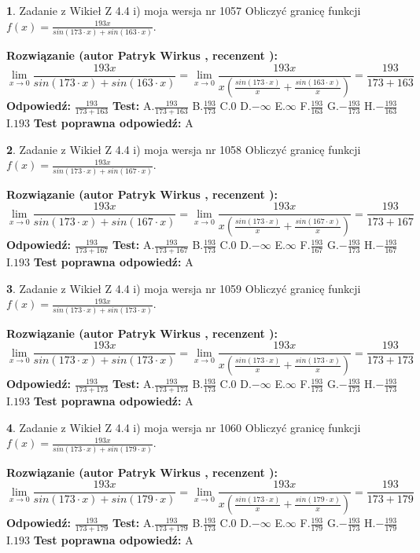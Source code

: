 \documentclass[12pt, a4paper]{article}
\theoremstyle{definition} %
\newtheorem{zad}{}
\newcommand{\zadStart}[1]{\begin{zad}#1\newline}
\newcommand{\zadStop}{\end{zad}}
\newcommand{\rozwStart}[2]{\noindent \textbf{Rozwiązanie (autor #1 , recenzent #2): }\newline}
\newcommand{\rozwStop}{\newline}
\newcommand{\odpStart}{\noindent \textbf{Odpowiedź:}\newline}
\newcommand{\odpStop}{\newline}
\newcommand{\testStart}{\noindent \textbf{Test:}\newline}
\newcommand{\testStop}{\newline}
\newcommand{\kluczStart}{\noindent \textbf{Test poprawna odpowiedź:}\newline}
\newcommand{\kluczStop}{\newline}
\begin{document}
\zadStart{Zadanie z Wikieł Z 4.4 i) moja wersja nr 1057}
Obliczyć granicę funkcji $f(x)=\frac{193x}{sin(173\cdot x) +sin(163\cdot x)}$.
\zadStop
\rozwStart{Patryk Wirkus}{}
$$\lim\limits_{x\to 0}\frac{193x}{sin(173\cdot x) +sin(163\cdot x)}=\lim\limits_{x\to 0}\frac{193x}{x(\frac{sin(173\cdot x)}{x}+\frac{sin(163\cdot x)}{x})}=\frac{193}{173+163}$$
\rozwStop
\odpStart
$\frac{193}{173+163}$
\odpStop
\testStart
A.$\frac{193}{173+163}$
B.$\frac{193}{173}$
C.$0$
D.$-\infty$
E.$\infty$
F.$\frac{193}{163}$
G.$-\frac{193}{173}$
H.$-\frac{193}{163}$
I.$193$
\testStop
\kluczStart
A
\kluczStop



\zadStart{Zadanie z Wikieł Z 4.4 i) moja wersja nr 1058}
Obliczyć granicę funkcji $f(x)=\frac{193x}{sin(173\cdot x) +sin(167\cdot x)}$.
\zadStop
\rozwStart{Patryk Wirkus}{}
$$\lim\limits_{x\to 0}\frac{193x}{sin(173\cdot x) +sin(167\cdot x)}=\lim\limits_{x\to 0}\frac{193x}{x(\frac{sin(173\cdot x)}{x}+\frac{sin(167\cdot x)}{x})}=\frac{193}{173+167}$$
\rozwStop
\odpStart
$\frac{193}{173+167}$
\odpStop
\testStart
A.$\frac{193}{173+167}$
B.$\frac{193}{173}$
C.$0$
D.$-\infty$
E.$\infty$
F.$\frac{193}{167}$
G.$-\frac{193}{173}$
H.$-\frac{193}{167}$
I.$193$
\testStop
\kluczStart
A
\kluczStop



\zadStart{Zadanie z Wikieł Z 4.4 i) moja wersja nr 1059}
Obliczyć granicę funkcji $f(x)=\frac{193x}{sin(173\cdot x) +sin(173\cdot x)}$.
\zadStop
\rozwStart{Patryk Wirkus}{}
$$\lim\limits_{x\to 0}\frac{193x}{sin(173\cdot x) +sin(173\cdot x)}=\lim\limits_{x\to 0}\frac{193x}{x(\frac{sin(173\cdot x)}{x}+\frac{sin(173\cdot x)}{x})}=\frac{193}{173+173}$$
\rozwStop
\odpStart
$\frac{193}{173+173}$
\odpStop
\testStart
A.$\frac{193}{173+173}$
B.$\frac{193}{173}$
C.$0$
D.$-\infty$
E.$\infty$
F.$\frac{193}{173}$
G.$-\frac{193}{173}$
H.$-\frac{193}{173}$
I.$193$
\testStop
\kluczStart
A
\kluczStop



\zadStart{Zadanie z Wikieł Z 4.4 i) moja wersja nr 1060}
Obliczyć granicę funkcji $f(x)=\frac{193x}{sin(173\cdot x) +sin(179\cdot x)}$.
\zadStop
\rozwStart{Patryk Wirkus}{}
$$\lim\limits_{x\to 0}\frac{193x}{sin(173\cdot x) +sin(179\cdot x)}=\lim\limits_{x\to 0}\frac{193x}{x(\frac{sin(173\cdot x)}{x}+\frac{sin(179\cdot x)}{x})}=\frac{193}{173+179}$$
\rozwStop
\odpStart
$\frac{193}{173+179}$
\odpStop
\testStart
A.$\frac{193}{173+179}$
B.$\frac{193}{173}$
C.$0$
D.$-\infty$
E.$\infty$
F.$\frac{193}{179}$
G.$-\frac{193}{173}$
H.$-\frac{193}{179}$
I.$193$
\testStop
\kluczStart
A
\kluczStop
\end{document}

